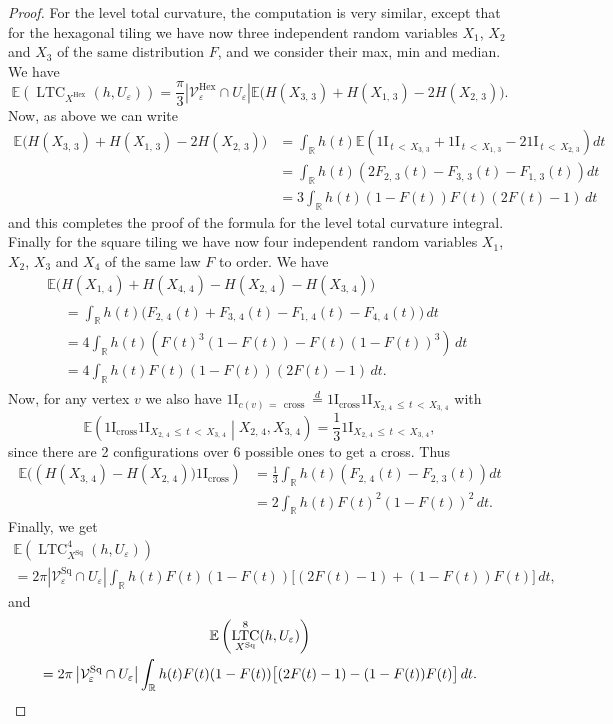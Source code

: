 \documentclass[AHL,Unicode,longabstracts,published]{cedram}
\newcommand{\R}{\mathbb{R}}
\newcommand{\E}{\mathbb{E}}
\newcommand{\ind}{{1\!\!\mathrm{I}}}
\newcommand{\eps}{\varepsilon}
\DeclareMathOperator{\LTC}{LTC}
\DeclareMathOperator{\Hex}{Hex}
\DeclareMathOperator{\Sq}{Sq}
\DeclareMathOperator{\cross}{cross}
\newcommand{\calV}{\mathcal{V}}
\begin{document}
\begin{proof}
For the level total curvature, the computation is very similar, except that for the hexagonal tiling we have now three independent random variables $X_1$, $X_2$ and $X_3$ of the same distribution $F$, and we consider their max, min and median. We have
\[
\E\left(\LTC_{X^{\Hex}}(h,U_{\eps})\right) = \frac{\pi}{3} \left|\calV_{\eps}^{\Hex}\cap U_{\eps}\right| \E\big(H\left(X_{3,\,3}\right) +
H\left(X_{1,\,3}\right) - 2 H\left(X_{2,\,3}\right)\big).
\]
Now, as above we can write
\begin{align*}
\E\big(H\left(X_{3,\,3}\right) + H\left(X_{1,\,3}\right) - 2 H\left(X_{2,\,3}\right)\big) & = \int_\R h(t) \E\left(
\ind_{\,t\,<\,X_{3,\,3}}+\ind_{\,t\,<\, X_{1,\,3}}-2\ind_{\,t\,<\,X_{2,\,3}} \right)dt \\
&=\int_\R h(t) \left(2F_{2,\,3}(t)-F_{3,\,3}(t)-F_{1,\,3}(t)\right)dt\\
& =3 \int_\R h(t) (1- F(t)) F(t) (2F(t) -1) \, dt
\end{align*}
and this completes the proof of the formula for the level total curvature integral. Finally for the square tiling we have now four independent random variables $X_1$, $X_2$, $X_3$ and $X_4$ of the same law $F$ to order. We have
\begin{multline*}
\E\big(H\left(X_{1,\,4}\right) + H\left(X_{4,\,4}\right) -H\left(X_{2,\,4}\right) -H\left(X_{3,\,4}\right)\big) \\
\begin{aligned}
&= \int_\R h(t)\big(F_{2,\,4}(t)+F_{3,\,4}(t)-F_{1,\,4}(t)-F_{4,\,4}(t)\big)\, dt\\
& = 4 \int_\R h(t) \left(F(t)^3(1-F(t))-F(t)(1-F(t))^3\right) \, dt \\
&=4 \int_\R h(t) F(t)(1- F(t))(2F(t) -1) \, dt.
\end{aligned}
\end{multline*}
Now, for any vertex $v$ we also have $\ind_{c(v)\,=\,\cross}\stackrel{d}{=}\ind_{\cross}\ind_{X_{2,\,4}\,\le\,t\,<\,X_{3,\,4}}$ with
\[
\E\left(\ind_{\cross}\ind_{X_{2,\,4}\,\le\,t\,<\,X_{3,\,4}}\middle|X_{2,\,4},X_{3,\,4}\right)=\frac{1}{3}\ind_{X_{2,\,4}\,\le\,t\,<\,X_{3,\,4}},
\]
since there are 2 configurations over 6 possible ones to get a cross. Thus
\begin{align*}
\E\big(\left(H\left(X_{3,\,4}\right) -H\left(X_{2,\,4}\right)\big) \ind_{\cross}\right) & = \frac{1}{3}\int_\R h(t) \left(F_{2,\,4}(t)-F_{2,\,3}(t)\right) dt\\
&=2\int_\R h(t) F(t)^2(1- F(t))^2\,dt.
\end{align*}
Finally, we get
\begin{multline*}
\E\left(\LTC^4_{X^{\Sq}}(h,U_{\eps})\right)\\
= 2\pi \left|\calV_\eps^{\Sq} \cap U_\eps\right|\int_\R h(t) F(t)
(1- F(t)) \big[(2F(t) - 1) +(1-F(t))F(t)\big] \,dt,
\end{multline*}
and
\begin{multline*}
\E\left(\LTC^8_{X^{\Sq}}(h,U_\eps)\right)\\
= 2\pi \left|\calV_\eps^{\Sq} \cap U_\eps\right| \int_\R h(t) F(t)
(1- F(t)) \big[(2F(t) - 1) - (1-F(t))F(t)\big] \,dt.\qedhere
\end{multline*}
\end{proof}
\end{document}
